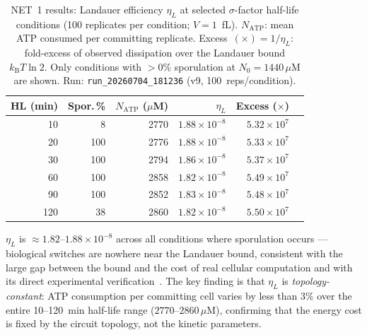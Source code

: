 \documentclass[11pt,a4paper]{article}
\newcommand{\kB}{k_{\mathrm{B}}}
\begin{document}
\begin{table}[h]
\centering
\caption{NET~1 results: Landauer efficiency \(\eta_L\) at selected
\(\sigma\)-factor half-life conditions (100 replicates per condition;
\(V = 1\)~fL).  \(N_{\mathrm{ATP}}\): mean ATP consumed per
committing replicate.  Excess~\((\times) = 1/\eta_L\): fold-excess of observed
dissipation over the Landauer bound \(\kB T \ln 2\).
Only conditions with $>0\%$ sporulation at $N_0 = 1440\,\mu$M are shown.
Run: \texttt{run\_20260704\_181236} (v9, 100~reps/condition).}
\label{tab:t1}
\begin{tabular}{rrrrrr}
\toprule
HL (min) & Spor.\,\% & \(N_{\mathrm{ATP}}\) (\(\mu\)M) & \(\eta_L\)
  & Excess (\(\times\)) \\
\midrule
10  &   8 & 2770 & \(1.88\times10^{-8}\) & \(5.32\times10^{7}\) \\
20  & 100 & 2776 & \(1.88\times10^{-8}\) & \(5.33\times10^{7}\) \\
30  & 100 & 2794 & \(1.86\times10^{-8}\) & \(5.37\times10^{7}\) \\
60  & 100 & 2858 & \(1.82\times10^{-8}\) & \(5.49\times10^{7}\) \\
90  & 100 & 2852 & \(1.83\times10^{-8}\) & \(5.48\times10^{7}\) \\
120 &  38 & 2860 & \(1.82\times10^{-8}\) & \(5.50\times10^{7}\) \\
\bottomrule
\end{tabular}
\end{table}

\(\eta_L\) is $\approx 1.82$--$1.88 \times 10^{-8}$ across all conditions
where sporulation occurs --- biological switches are nowhere near the Landauer
bound, consistent with the large gap between the bound and the cost of real
cellular computation and with its direct experimental
verification~\cite{MehtaSchwab2012,Berut2012}.
The key finding is that $\eta_L$ is \emph{topology-constant}: ATP consumption
per committing cell varies by less than $3\%$ over the entire 10--120~min
half-life range ($2770$--$2860\,\mu$M), confirming that the energy cost
is fixed by the circuit topology, not the kinetic parameters.
\end{document}
